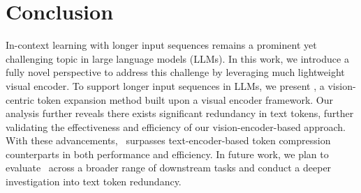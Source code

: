 \section{Conclusion}
In-context learning with longer input sequences remains a prominent yet challenging topic in large language models (LLMs). 
In this work, we introduce a fully novel perspective to address this challenge by leveraging much lightweight visual encoder.
To support longer input sequences in LLMs, we present \ourname, a vision-centric token expansion method built upon a visual encoder framework. 
Our analysis further reveals there exists significant redundancy in text tokens, further validating the effectiveness and efficiency of our vision-encoder-based approach.
With these advancements, \ourname\ surpasses text-encoder-based token compression counterparts in both performance and efficiency. 
In future work, we plan to evaluate \ourname\ across a broader range of downstream tasks and conduct a deeper investigation into text token redundancy.
